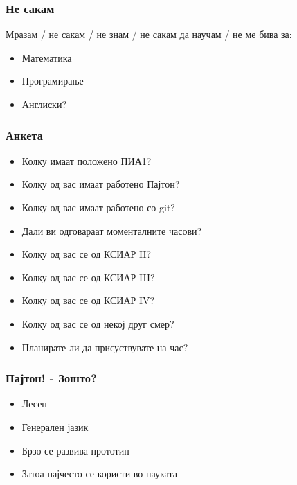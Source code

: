 \documentclass{beamer}
\begin{document}
\begin{frame}
\frametitle{Не сакам}

Мразам / не сакам / не знам / не сакам да научам / не ме бива за:
\begin{itemize}

\item Математика

\item Програмирање

\item Англиски?

\end{itemize}


\end{frame}



\begin{frame}
\frametitle{Анкета}

\begin{itemize}

\item Колку имаат положено ПИА1?

\item Колку од вас имаат работено Пајтон?

\item Колку од вас имаат работено со git?

\item Дали ви одговараат моменталните часови?

\item Колку од вас се од КСИАР II?

\item Колку од вас се од КСИАР III?

\item Колку од вас се од КСИАР IV?

\item Колку од вас се од некој друг смер?

\item Планирате ли да присуствувате на час?

\end{itemize}

\end{frame}


\begin{frame}
\frametitle{Пајтон! - Зошто?}

\begin{itemize}

\item Лесен

\item Генерален јазик

\item Брзо се развива прототип

\item Затоа најчесто се користи во науката

\end{itemize}

\end{frame}
\end{document}
